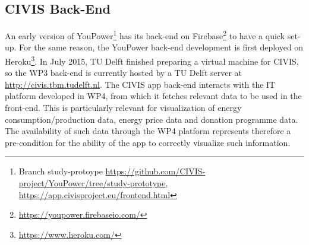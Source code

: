 
\subsection{CIVIS Back-End}

An early version of YouPower\footnote{Branch study-protoype \url{https://github.com/CIVIS-project/YouPower/tree/study-prototype}, 
\url{https://app.civisproject.eu/frontend.html}} has its back-end on Firebase\footnote{\url{https://youpower.firebaseio.com/}} to have a quick set-up.  
For the same reason, the YouPower back-end development is first deployed on Heroku\footnote{\url{https://www.heroku.com/}}. In July 2015, TU Delft finished preparing a virtual machine for CIVIS, so the WP3 back-end is currently hosted by a TU Delft server at {\footnotesize\url{http://civis.tbm.tudelft.nl}}. The CIVIS app back-end interacts with the IT platform developed in WP4, from which it fetches relevant data to be used in the front-end. This is particularly relevant for visualization of energy consumption/production data, energy price data and donation programme data. The availability of such data through the WP4 platform represents therefore a pre-condition for the ability of the app to correctly visualize such information.

